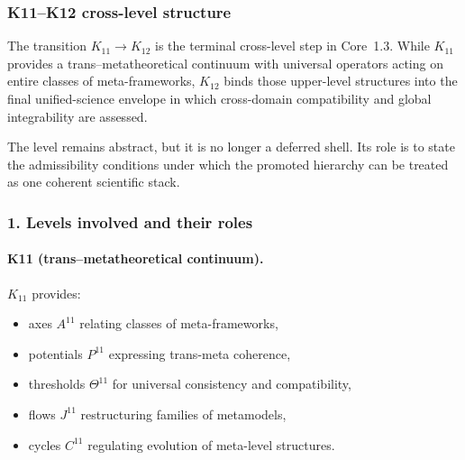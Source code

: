 
\subsubsection{K11–K12 cross-level structure}
\label{sec:crossk-k11-k12}

The transition $K_{11} \rightarrow K_{12}$ is the terminal cross-level step in
Core~1.3. While $K_{11}$ provides a trans–metatheoretical continuum with
universal operators acting on entire classes of meta-frameworks, $K_{12}$
binds those upper-level structures into the final unified-science envelope in
which cross-domain compatibility and global integrability are assessed.

The level remains abstract, but it is no longer a deferred shell. Its role is to
state the admissibility conditions under which the promoted hierarchy can be
treated as one coherent scientific stack.

\subsubsection{1. Levels involved and their roles}

\paragraph{K11 (trans–metatheoretical continuum).}
$K_{11}$ provides:
\begin{itemize}
  \item axes $A^{11}$ relating classes of meta-frameworks,
  \item potentials $P^{11}$ expressing trans-meta coherence,
  \item thresholds $\Theta^{11}$ for universal consistency and compatibility,
  \item flows $J^{11}$ restructuring families of metamodels,
  \item cycles $C^{11}$ regulating evolution of meta-level structures.
\end{itemize}

